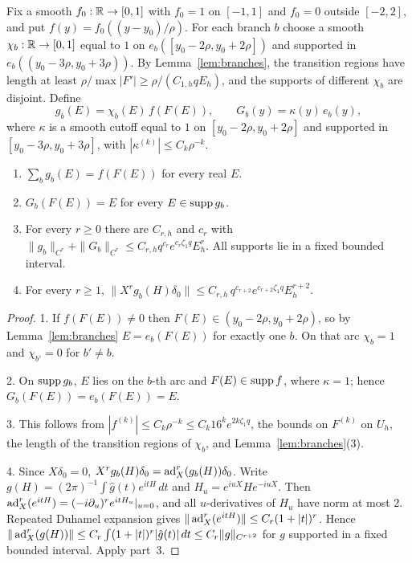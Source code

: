 Fix a smooth $f_0:\mathbb R\to[0,1]$ with $f_0=1$ on $[-1,1]$ and $f_0=0$ outside $[-2,2]$, and put $f(y)=f_0((y-y_0)/\rho)$. For each branch $b$ choose a smooth $\chi_b:\mathbb R\to[0,1]$ equal to $1$ on $e_b([y_0-2\rho,y_0+2\rho])$ and supported in $e_b((y_0-3\rho,y_0+3\rho))$. By Lemma~\ref{lem:branches}, the transition regions have length at least $\rho/\max|F'|\ge\rho/(C_{1,h}qE_h)$, and the supports of different $\chi_b$ are disjoint. Define
\[
g_b(E)=\chi_b(E)\,f(F(E)),\qquad G_b(y)=\kappa(y)\,e_b(y),
\]
where $\kappa$ is a smooth cutoff equal to $1$ on $[y_0-2\rho,y_0+2\rho]$ and supported in $[y_0-3\rho,y_0+3\rho]$, with $|\kappa^{(k)}|\le C_k\rho^{-k}$.

\begin{lemma}\label{lem:filters}
\begin{enumerate}
\item $\sum_bg_b(E)=f(F(E))$ for every real $E$.
\item $G_b(F(E))=E$ for every $E\in\operatorname{supp} g_b$.
\item For every $r\ge0$ there are $C_{r,h}$ and $c_r$ with $\|g_b\|_{C^r}+\|G_b\|_{C^r}\le C_{r,h}q^{c_r}e^{c_r\zeta_1q}E_h^{r}$. All supports lie in a fixed bounded interval.
\item For every $r\ge1$, $\|X^rg_b(H)\delta_0\|\le C_{r,h}\,q^{c_{r+2}}e^{c_{r+2}\zeta_1q}E_h^{r+2}$.
\end{enumerate}
\end{lemma}

\begin{proof}
1. If $f(F(E))\ne0$ then $F(E)\in(y_0-2\rho,y_0+2\rho)$, so by Lemma~\ref{lem:branches} $E=e_b(F(E))$ for exactly one $b$. On that arc $\chi_b=1$ and $\chi_{b'}=0$ for $b'\ne b$.

2. On $\operatorname{supp} g_b$, $E$ lies on the $b$-th arc and $F(E)\in\operatorname{supp} f$, where $\kappa=1$; hence $G_b(F(E))=e_b(F(E))=E$.

3. This follows from $|f^{(k)}|\le C_k\rho^{-k}\le C_k16^ke^{2k\zeta_1q}$, the bounds on $F^{(k)}$ on $U_h$, the length of the transition regions of $\chi_b$, and Lemma~\ref{lem:branches}(3).

4. Since $X\delta_0=0$, $X^rg_b(H)\delta_0=\operatorname{ad}_X^r(g_b(H))\delta_0$. Write $g(H)=(2\pi)^{-1}\int\hat g(t)e^{itH}\,dt$ and $H_u=e^{iuX}He^{-iuX}$. Then $\operatorname{ad}_X^r(e^{itH})=(-i\partial_u)^re^{itH_u}|_{u=0}$, and all $u$-derivatives of $H_u$ have norm at most $2$. Repeated Duhamel expansion gives $\|\operatorname{ad}_X^r(e^{itH})\|\le C_r(1+|t|)^r$. Hence $\|\operatorname{ad}^r_X(g(H))\|\le C_r\int(1+|t|)^r|\hat g(t)|\,dt\le C_r\|g\|_{C^{r+2}}$ for $g$ supported in a fixed bounded interval. Apply part~3.
\end{proof}

